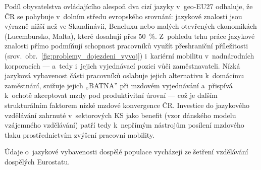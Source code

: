 Podíl obyvatelstva ovládajícího alespoň dva cizí jazyky v~\acs{geo-EU27} odhaluje, že \ac{ČR} se pohybuje v~dolním středu evropského srovnání: jazykové znalosti jsou výrazně nižší než ve Skandinávii, Beneluxu nebo malých otevřených ekonomikách (Lucembursko, Malta), které dosahují přes \SI{50}{\percent}.
Z~pohledu trhu práce jazykové znalosti přímo podmíňují schopnost pracovníků využít přeshraniční příležitosti (srov.~obr.~\ref{fig:problemy_dojezdeni_vyvoj}) i~kariérní mobilitu v~nadnárodních korporacích --- a~tedy i~jejich vyjednávací pozici vůči zaměstnavateli.
Nízká jazyková vybavenost části pracovníků oslabuje jejich alternativu k~domácímu zaměstnání, snižuje jejich „BATNA” při mzdovém vyjednávání a~přispívá k~ochotě akceptovat mzdy pod produktivitní úrovní --- což je dalším strukturálním faktorem nízké mzdové konvergence ČR.
Investice do jazykového vzdělávání zahrnuté v~sektorových \ac{KS} jako benefit (vzor dánského modelu vzájemného vzdělávání) patří tedy k~nepřímým nástrojům posílení mzdového tlaku prostřednictvím zvýšení pracovní mobility.

Údaje o~jazykové vybavenosti dospělé populace vycházejí ze šetření vzdělávání dospělých Eurostatu.\par



